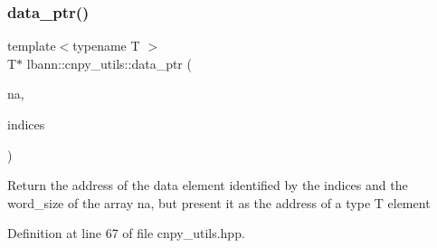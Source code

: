 \mbox{\label{namespacelbann_1_1cnpy__utils_a348a4aa859715e5859ddd1a5e3a269c9}} 
\subsubsection{\texorpdfstring{data\+\_\+ptr()}{data\_ptr()}}
{\footnotesize\ttfamily template$<$typename T $>$ \\
T$\ast$ lbann\+::cnpy\+\_\+utils\+::data\+\_\+ptr (\begin{DoxyParamCaption}\item[{const cnpy\+::\+Npy\+Array \&}]{na,  }\item[{const std\+::vector$<$ size\+\_\+t $>$}]{indices }\end{DoxyParamCaption})\hspace{0.3cm}{\ttfamily [inline]}}

Return the address of the data element identified by the indices and the word\+\_\+size of the array na, but present it as the address of a type T element 

Definition at line 67 of file cnpy\+\_\+utils.\+hpp.


